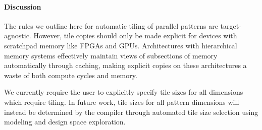 \documentclass[pageno]{jpaper}
\begin{document}
\paragraph{Discussion}
The rules we outline here for automatic tiling of parallel patterns are target-agnostic. However, tile copies should only be made explicit
for devices with scratchpad memory like FPGAs and GPUs. Architectures with hierarchical memory systems effectively maintain views of subsections of memory
automatically through caching, making explicit copies on these architectures a waste of both compute cycles and memory.

We currently require the user to explicitly specify tile sizes for all dimensions which require tiling. In future work, tile sizes for all pattern
dimensions will instead be determined by the compiler through automated tile size selection using modeling and design space exploration.
\end{document}
